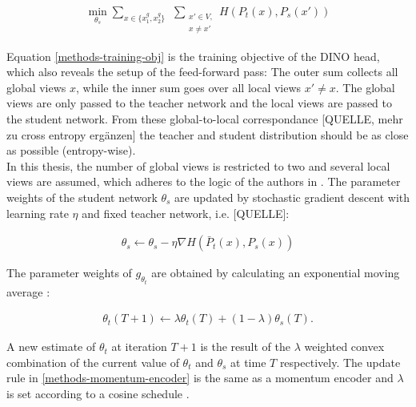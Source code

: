\begin{align}
	\min_{\theta_s}\sum_{x \in \{x_1^g, x_2^g\}} \hspace{5pt} \sum_{\substack{ x'\in V, \\ x\neq x'}} H(P_t(x),P_s(x'))
	\label{methods-training-obj}
\end{align}

Equation \ref{methods-training-obj} is the training objective of the DINO head, which also reveals the setup of the feed-forward pass:
The outer sum collects all global views $x$, while the inner sum goes over all local views $x'\neq x$.
The global views are only passed to the teacher network and the local views are passed to the student network.
From these global-to-local correspondance [QUELLE, mehr zu cross entropy ergänzen] the teacher and student distribution should be as close as possible (entropy-wise).
\\
In this thesis, the number of global views is restricted to two and several local views are assumed, which adheres to the logic of the authors in \citep{Caron2021}. 
The parameter weights of the student network $\theta_s$ are updated by stochastic gradient descent with learning rate $\eta$ and fixed teacher network, i.e. [QUELLE]:

\begin{align}
	\theta_s \leftarrow \theta_s - \eta \nabla H(\bar{P}_t(x),P_s(x))
\end{align}

The parameter weights of $g_{\theta_t}$ are obtained by calculating an exponential moving average \citep{Grill2020,Caron2021}: 

\begin{align}
	\theta_t(T+1) \leftarrow \lambda \theta_t(T) + (1-\lambda) \theta_s(T).
	\label{methods-momentum-encoder}
\end{align}

A new estimate of $\theta_t$ at iteration $T+1$ is the result of the $\lambda$ weighted convex combination of the current value of $\theta_t$ and $\theta_s$ at time $T$ respectively.
The update rule in \ref{methods-momentum-encoder} is the same as a momentum encoder \citep{He2019} and $\lambda$ is set according to a cosine schedule \citep{Grill2020}.